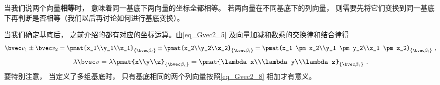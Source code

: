 当我们说两个向量\textbf{相等}时， 意味着同一基底下两向量的坐标全都相等。 若两向量在不同基底下的列向量， 则需要先将它们变换到同一基底下再判断是否相等（我们以后再讨论如何进行基底变换）。

当我们确定基底后， 之前介绍的都有对应的坐标运算。由\autoref{eq_Gvec2_5} 及向量加减和数乘的交换律和结合律得
\begin{equation}\label{eq_Gvec2_8}
\bvec v_1 \pm \bvec v_2 = \pmat{x_1\\y_1\\z_1}_{\{\bvec\beta_i\}} \pm \pmat{x_2\\y_2\\z_2}_{\{\bvec\beta_i\}} = \pmat{x_1 \pm x_2\\y_1 \pm y_2\\z_1 \pm z_2}_{\{\bvec\beta_i\}}~,
\end{equation}
\begin{equation}\label{eq_Gvec2_9}
\lambda \bvec v = \lambda\pmat{x\\y\\z}_{\{\bvec\beta_i\}} = \pmat{\lambda x\\\lambda y\\\lambda z}_{\{\bvec\beta_i\}}~.
\end{equation}
要特别注意， 当定义了多组基底时， 只有基底相同的两个列向量按照\autoref{eq_Gvec2_8} 相加才有意义。
